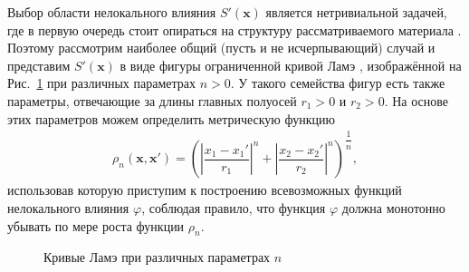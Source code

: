 Выбор области нелокального влияния $S'(\boldsymbol{x})$ является нетривиальной задачей, где в первую очередь стоит опираться на структуру рассматриваемого материала \cite{Eringen3}. Поэтому рассмотрим наиболее общий (пусть и не исчерпывающий) случай и представим $S'(\boldsymbol{x})$ в виде фигуры ограниченной кривой Ламэ \cite{Superellipse}, изображённой на Рис.~\ref{fig:SuperEllipse} при различных параметрах $n > 0$. У такого семейства фигур есть также параметры, отвечающие за длины главных полуосей $r_1 > 0$ и $r_2 > 0$. На основе этих параметров можем определить метрическую функцию
\begin{gather}
	\label{eq:metricFunction}
	\rho_n(\boldsymbol{x}, \boldsymbol{x}') = 
	\left(
		\left| \dfrac{x_1 - x_1'}{r_1} \right|^n +
		\left| \dfrac{x_2 - x_2'}{r_2} \right|^n
	\right)^{\dfrac{1}{n}},
\end{gather}
использовав которую приступим к построению всевозможных функций нелокального влияния $\varphi$, соблюдая правило, что функция $\varphi$ должна монотонно убывать по мере роста функции $\rho_n$.

\begin{figure}[ht]
    \caption{Кривые Ламэ при различных параметрах $n$}\label{fig:SuperEllipse}
\end{figure}


